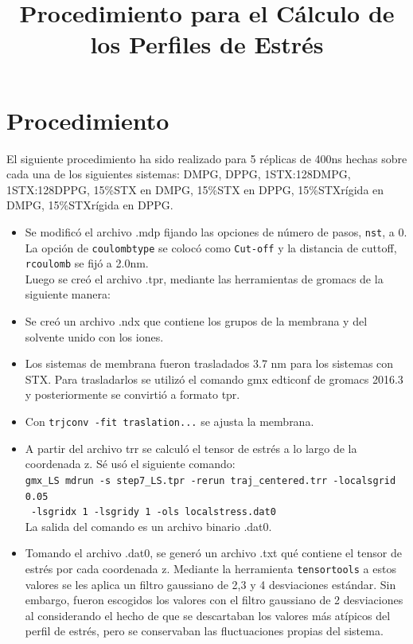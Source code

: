 \documentclass[12pt]{article}
\title{Procedimiento para el Cálculo de los Perfiles de Estrés}
\begin{document}
\maketitle
\section{Procedimiento}
El siguiente procedimiento ha sido realizado para 5 réplicas de 400ns hechas sobre cada una de los siguientes sistemas: DMPG, DPPG, 1STX:128DMPG, 1STX:128DPPG, 15\%STX en DMPG, 15\%STX en DPPG, 15\%STXrígida en DMPG, 15\%STXrígida en DPPG.\\
\begin{itemize}

\item Se modificó el archivo .mdp fijando las opciones de número de pasos, \texttt{nst}, a 0. La opción de \texttt{coulombtype} se colocó como \texttt{Cut-off} y la distancia de cuttoff, \texttt{rcoulomb} se fijó a 2.0nm.\\

Luego se creó el archivo .tpr, mediante las herramientas de gromacs de la siguiente manera:

\item Se creó un archivo .ndx que contiene los grupos de la membrana y del solvente unido con los iones.
\item Los sistemas de membrana fueron trasladados 3.7 nm para los sistemas con STX. Para trasladarlos se utilizó el comando gmx edticonf de gromacs 2016.3 y posteriormente se convirtió a formato tpr. %
\item Con \texttt{trjconv -fit traslation...} se ajusta la membrana.


\item A partir del archivo trr se calculó el tensor de estrés a lo largo de la coordenada z. Sé usó el siguiente comando:\\
\texttt{gmx\_LS mdrun -s step7\_LS.tpr -rerun traj\_centered.trr -localsgrid 0.05}\\
\texttt{ -lsgridx 1 -lsgridy 1 -ols localstress.dat0}\\

La salida del comando es un archivo binario .dat0.\\

\item Tomando el archivo .dat0, se generó un archivo .txt qué contiene el tensor de estrés por cada coordenada z. Mediante la herramienta \texttt{tensortools} a estos valores se les aplica un filtro gaussiano de 2,3 y 4 desviaciones estándar. Sin embargo, fueron escogidos los valores con el filtro gaussiano de 2 desviaciones al considerando el hecho de que se descartaban los valores más atípicos del perfil de estrés, pero se conservaban las fluctuaciones propias del sistema.\\


\end{itemize}
\end{document}
